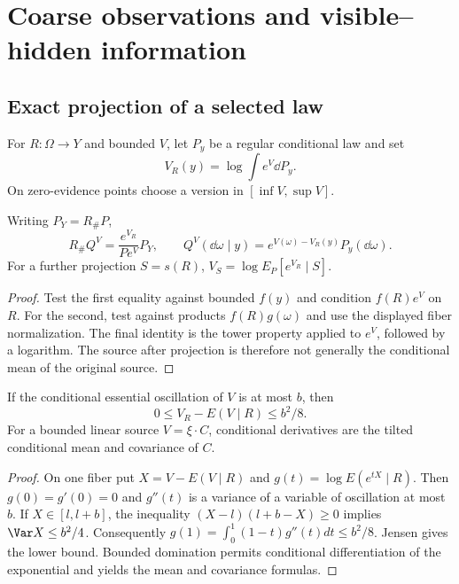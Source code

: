 \section{Coarse observations and visible--hidden information}\label{sec:information}
\subsection{Exact projection of a selected law}
For $R:\Omega\to Y$ and bounded $V$, let $P_y$ be a regular conditional law and set
\[
 V_R(y)=\log\int e^V\dd P_y.
\]
On zero-evidence points choose a version in $[\inf V,\sup V]$.

\begin{theorem}\label{thm:projection}
Writing $P_Y=R_\#P$,
\[
 R_\#Q^V=\frac{e^{V_R}}{Pe^V}P_Y,
 \qquad Q^V(\dd\omega\mid y)=e^{V(\omega)-V_R(y)}P_y(\dd\omega).
\]
For a further projection $S=s(R)$,
$V_S=\log E_P[e^{V_R}\mid S]$.
\end{theorem}
\begin{proof}
Test the first equality against bounded $f(y)$ and condition $f(R)e^V$ on $R$. For the second, test against products $f(R)g(\omega)$ and use the displayed fiber normalization. The final identity is the tower property applied to $e^V$, followed by a logarithm. The source after projection is therefore not generally the conditional mean of the original source.
\end{proof}

\begin{proposition}\label{prop:jensen}
If the conditional essential oscillation of $V$ is at most $b$, then
\[
 0\le V_R-E(V\mid R)\le b^2/8.
\]
For a bounded linear source $V=\xi\cdot C$, conditional derivatives are the tilted conditional mean and covariance of $C$.
\end{proposition}
\begin{proof}
On one fiber put $X=V-E(V\mid R)$ and $g(t)=\log E(e^{tX}\mid R)$. Then $g(0)=g'(0)=0$ and $g''(t)$ is a variance of a variable of oscillation at most $b$. If $X\in[l,l+b]$, the inequality $(X-l)(l+b-X)\ge0$ implies $\Var X\le b^2/4$. Consequently $g(1)=\int_0^1(1-t)g''(t)dt\le b^2/8$. Jensen gives the lower bound. Bounded domination permits conditional differentiation of the exponential and yields the mean and covariance formulas.
\end{proof}

